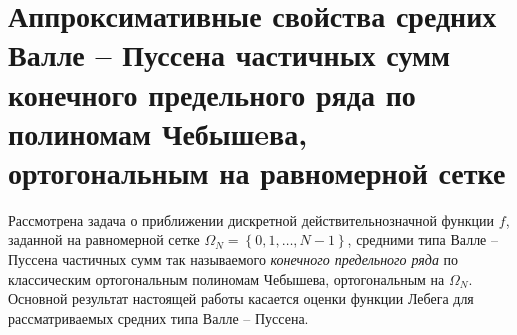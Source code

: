 
\chapter{Аппроксимативные свойства средних Валле -- Пуссена частичных сумм
конечного предельного ряда по полиномам Чебышeва, ортогональным на равномерной сетке}


Рассмотрена задача о приближении дискретной действительнозначной функции $f$, заданной на равномерной сетке $\Omega_N = \left\{ 0, 1, \ldots, N-1 \right\}$, средними типа Валле -- Пуссена частичных сумм так называемого \textit{конечного предельного ряда} по классическим ортогональным полиномам Чебышева, ортогональным на $\Omega_N$. Основной результат настоящей работы касается оценки функции Лебега для рассматриваемых средних типа Валле -- Пуссена.

